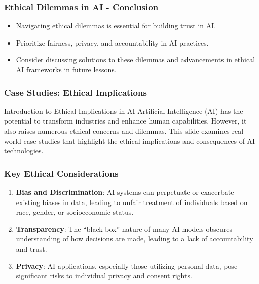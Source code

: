\documentclass[aspectratio=169]{beamer}
\begin{document}
\begin{frame}[fragile]
    \frametitle{Ethical Dilemmas in AI - Conclusion}
    \begin{itemize}
        \item Navigating ethical dilemmas is essential for building trust in AI.
        \item Prioritize fairness, privacy, and accountability in AI practices.
        \item Consider discussing solutions to these dilemmas and advancements in ethical AI frameworks in future lessons.
    \end{itemize}
\end{frame}

\begin{frame}[fragile]
    \frametitle{Case Studies: Ethical Implications}
    \begin{block}{Introduction to Ethical Implications in AI}
        Artificial Intelligence (AI) has the potential to transform industries and enhance human capabilities. However, it also raises numerous ethical concerns and dilemmas. This slide examines real-world case studies that highlight the ethical implications and consequences of AI technologies.
    \end{block}
\end{frame}

\begin{frame}[fragile]
    \frametitle{Key Ethical Considerations}
    \begin{enumerate}
        \item \textbf{Bias and Discrimination}: AI systems can perpetuate or exacerbate existing biases in data, leading to unfair treatment of individuals based on race, gender, or socioeconomic status.
        \item \textbf{Transparency}: The ``black box'' nature of many AI models obscures understanding of how decisions are made, leading to a lack of accountability and trust.
        \item \textbf{Privacy}: AI applications, especially those utilizing personal data, pose significant risks to individual privacy and consent rights.
    \end{enumerate}
\end{frame}
\end{document}
